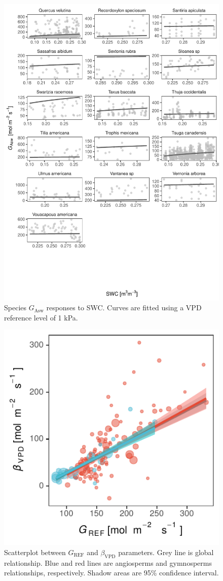 \documentclass[11pt,twoside]{reedthesis}
\begin{document}
\begin{figure}[H]

{\centering \includegraphics[width=1\linewidth]{figure/appendixD/ggg15} 

}

\caption{Species $G_{\text{Asw}}$ responses to SWC. Curves are fitted using a VPD reference level of 1 kPa.}\label{fig:unnamed-chunk-31}
\end{figure}
\begin{figure}[H]

{\centering \includegraphics[width=0.5\linewidth]{figure/appendixD/fig_Gref_b1} 

}

\caption[Scatterplot between $G_{\text{REF}}$ and $\beta_{\text{VPD}}$ parameters.]{Scatterplot between $G_{\text{REF}}$ and $\beta_{\text{VPD}}$ parameters. Grey line is global relationship. Blue and red lines are angiosperms and gymnosperms relationships, respectively. Shadow areas are 95\% confidence interval.}\label{fig:corrplot}
\end{figure}
\end{document}
